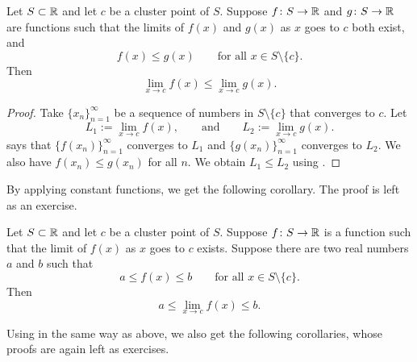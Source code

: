 \begin{cor}
Let $S \subset {\mathbb{R}}$ and let $c$ be a cluster point of $S$.  
Suppose $f \colon S \to
{\mathbb{R}}$ and $g \colon S \to {\mathbb{R}}$ are functions
such that
the limits of $f(x)$ and $g(x)$ as $x$ goes to $c$ both exist,
and
\begin{equation*}
f(x) \leq g(x) \qquad \text{for all } x \in S \setminus \{ c \}.
\end{equation*}
Then
\begin{equation*}
\lim_{x\to c} f(x) \leq \lim_{x\to c} g(x) .
\end{equation*}
\end{cor}

\begin{proof}
Take $\{ x_n \}_{n=1}^\infty$ be a sequence of numbers in $S \setminus \{ c \}$
that converges to $c$.  Let
\begin{equation*}
L_1 := \lim_{x\to c} f(x), \qquad \text{and} \qquad L_2 := \lim_{x\to c} g(x) .
\end{equation*}
 says that $\bigl\{ f(x_n) \bigr\}_{n=1}^\infty$ converges to
$L_1$ and $\bigl\{ g(x_n) \bigr\}_{n=1}^\infty$ converges to $L_2$.  We also
have $f(x_n) \leq g(x_n)$ for all $n$.
We obtain $L_1 \leq L_2$ using
.
\end{proof}

By applying constant functions, we get the following corollary.  The
proof is left as an exercise.

\begin{cor} \label{fconstineq:cor}
Let $S \subset {\mathbb{R}}$ and let $c$ be a cluster point of $S$.  Suppose $f \colon S \to
{\mathbb{R}}$ is a function such that the limit of $f(x)$ as $x$ goes to $c$
exists.
Suppose there are two real numbers $a$ and $b$ such that
\begin{equation*}
a \leq f(x) \leq b \qquad \text{for all } x \in S \setminus \{ c \}.
\end{equation*}
Then
\begin{equation*}
a \leq \lim_{x\to c} f(x) \leq b .
\end{equation*}
\end{cor}

Using  in the same way as above, we also get
the following corollaries, whose proofs are again left as exercises.


